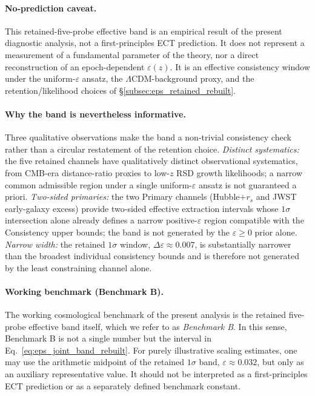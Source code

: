 \paragraph{No-prediction caveat.}
This retained-five-probe effective band is an empirical result of the
present diagnostic analysis, not a first-principles ECT prediction. It
does not represent a measurement of a fundamental parameter of the
theory, nor a direct reconstruction of an epoch-dependent
$\varepsilon(z)$. It is an effective consistency window under the
uniform-$\varepsilon$ ansatz, the $\Lambda$CDM-background proxy, and
the retention/likelihood choices of \S\ref{subsec:eps_retained_rebuilt}.

\paragraph{Why the band is nevertheless informative.}
Three qualitative observations make the band a non-trivial consistency
check rather than a circular restatement of the retention choice.
\emph{Distinct systematics:} the five retained channels have
qualitatively distinct observational systematics, from CMB-era
distance-ratio proxies to low-$z$ RSD growth likelihoods; a narrow
common admissible region under a single uniform-$\varepsilon$ ansatz
is not guaranteed a priori. \emph{Two-sided primaries:} the two
Primary channels (Hubble$+r_s$ and JWST early-galaxy excess) provide
two-sided effective extraction intervals whose $1\sigma$ intersection
alone already defines a narrow positive-$\varepsilon$ region compatible
with the Consistency upper bounds; the band is not generated by the
$\varepsilon \geq 0$ prior alone. \emph{Narrow width:} the retained
$1\sigma$ window, $\Delta\varepsilon \approx 0.007$, is substantially
narrower than the broadest individual consistency bounds and is
therefore not generated by the least constraining channel alone.

\paragraph{Working benchmark (Benchmark B).}
The working cosmological benchmark of the present analysis is the
retained five-probe effective band itself, which we refer to as
\emph{Benchmark B}. In this sense, Benchmark B is not a single number
but the interval in Eq.~\eqref{eq:eps_joint_band_rebuilt}. For purely
illustrative scaling estimates, one may use the arithmetic midpoint of
the retained $1\sigma$ band, $\varepsilon \approx 0.032$, but only as
an auxiliary representative value. It should not be interpreted as a
first-principles ECT prediction or as a separately defined benchmark
constant.

